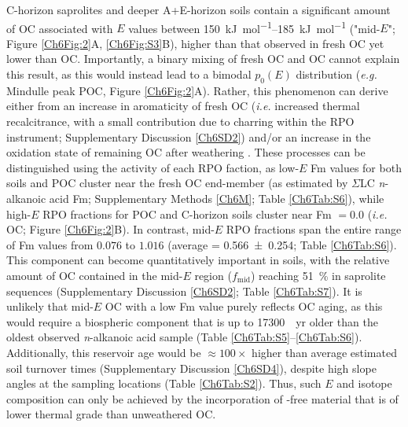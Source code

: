 C-horizon saprolites and deeper A+E-horizon soils contain a significant amount of OC associated with $E$ values between \SIrange{150}{185}{kJ.mol^{-1}} ("mid-$E$"; Figure \ref{Ch6Fig:2}A, \ref{Ch6Fig:S3}B), higher than that observed in fresh OC yet lower than OC. Importantly, a binary mixing of fresh OC and OC cannot explain this result, as this would instead lead to a bimodal $p_{0}(E)$ distribution (\textit{e.g.} Mindulle peak POC, Figure \ref{Ch6Fig:2}A). Rather, this phenomenon can derive either from an increase in aromaticity of fresh OC (\textit{i.e.} increased thermal recalcitrance, with a small contribution due to charring within the RPO instrument; Supplementary Discussion \ref{Ch6SD2}) and/or an increase in the oxidation state of remaining OC after weathering \citep[\textit{i.e.} decreased thermal recalcitrance; Chapter \ref{Ch3}][]{Williams:2014bq}. These processes can be distinguished using the  activity of each RPO faction, as low-$E$ Fm values for both soils and POC cluster near the fresh OC end-member (as estimated by $\Sigma$LC \textit{n}-alkanoic acid Fm; Supplementary Methods \ref{Ch6M}; Table \ref{Ch6Tab:S6}), while high-$E$ RPO fractions for POC and C-horizon soils cluster near Fm $= 0.0$ (\textit{i.e.} OC; Figure \ref{Ch6Fig:2}B). In contrast, mid-$E$ RPO fractions span the entire range of Fm values from $0.076$ to $1.016$ (average = \num{0.566 \pm 0.254}; Table \ref{Ch6Tab:S6}). This component can become quantitatively important in soils, with the relative amount of OC contained in the mid-$E$ region ($f_{\text{mid}}$) reaching \SI{51}{\%} in saprolite sequences (Supplementary Discussion \ref{Ch6SD2}; Table \ref{Ch6Tab:S7}). It is unlikely that mid-$E$ OC with a low Fm value purely reflects OC aging, as this would require a biospheric component that is up to \SI{17300}{.yr} older than the oldest observed \textit{n}-alkanoic acid sample (Table \ref{Ch6Tab:S5}--\ref{Ch6Tab:S6}). Additionally, this reservoir age would be $\approx 100\times$ higher than average estimated soil turnover times (Supplementary Discussion \ref{Ch6SD4}), despite high slope angles at the sampling locations (Table \ref{Ch6Tab:S2}). Thus, such $E$ and isotope composition can only be achieved by the incorporation of -free material that is of lower thermal grade than unweathered OC. 

